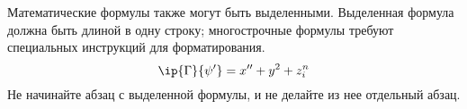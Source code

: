 \documentclass{article}      %
\begin{document}
Математические формулы также могут быть выделенными.
Выделенная формула должна быть длиной в одну строку;
многострочные формулы требуют специальных инструкций
для форматирования.
   \[  \ip{\Gamma}{\psi'} = x'' + y^{2} + z_{i}^{n}\]
Не начинайте абзац с выделенной формулы, и не делайте из
нее отдельный абзац.
\end{document}
